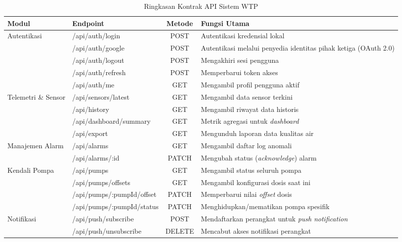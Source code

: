 \begin{table}[t]
    \centering
    \caption{Ringkasan Kontrak API Sistem WTP}
    \label{tab:api-summary}
    \renewcommand{\arraystretch}{1.2}
    \begin{tabular}{|p{3cm}|p{4.5cm}|c|p{5cm}|}
        \hline
        \textbf{Modul} & \textbf{Endpoint} & \textbf{Metode} & \textbf{Fungsi Utama} \\
        \hline
        \multirow{5}{*}{Autentikasi} 
        & /api/auth/login & POST & Autentikasi kredensial lokal \\
        & /api/auth/google & POST & Autentikasi melalui penyedia identitas pihak ketiga (OAuth 2.0) \\
        & /api/auth/logout & POST & Mengakhiri sesi pengguna \\
        & /api/auth/refresh & POST & Memperbarui token akses \\
        & /api/auth/me & GET & Mengambil profil pengguna aktif \\
        \hline
        \multirow{4}{*}{Telemetri \& Sensor} 
        & /api/sensors/latest & GET & Mengambil data sensor terkini \\
        & /api/history & GET & Mengambil riwayat data historis \\
        & /api/dashboard/summary & GET & Metrik agregasi untuk \textit{dashboard} \\
        & /api/export & GET & Mengunduh laporan data kualitas air \\
        \hline
        \multirow{2}{*}{Manajemen Alarm} 
        & /api/alarms & GET & Mengambil daftar log anomali \\
        & /api/alarms/:id & PATCH & Mengubah status (\textit{acknowledge}) alarm \\
        \hline
        \multirow{4}{*}{Kendali Pompa} 
        & /api/pumps & GET & Mengambil status seluruh pompa \\
        & /api/pumps/offsets & GET & Mengambil konfigurasi dosis saat ini \\
        & /api/pumps/:pumpId/offset & PATCH & Memperbarui nilai \textit{offset} dosis \\
        & /api/pumps/:pumpId/status & PATCH & Menghidupkan/mematikan pompa spesifik \\
        \hline
        \multirow{2}{*}{Notifikasi} 
        & /api/push/subscribe & POST & Mendaftarkan perangkat untuk \textit{push notification} \\
        & /api/push/unsubscribe & DELETE & Mencabut akses notifikasi perangkat \\
        \hline
    \end{tabular}
\end{table}

